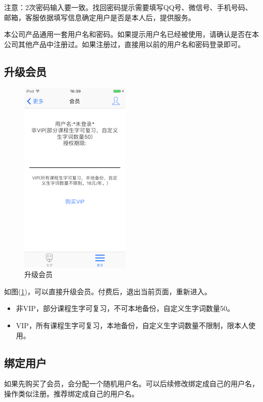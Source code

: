 注意：2次密码输入要一致。找回密码提示需要填写QQ号、微信号、手机号码、邮箱，客服依据填写信息确定用户是否是本人后，提供服务。

本公司产品通用一套用户名和密码。如果提示用户名已经被使用，请确认是否在本公司其他产品中注册过。如果注册过，直接用以前的用户名和密码登录即可。

\subsection{升级会员}
\begin{figure}[H]
	\centering
	\includegraphics{img/12.png}
	\caption{升级会员}
	\label{img12}
\end{figure}
如图(\ref{img12})，可以直接升级会员。付费后，退出当前页面，重新进入。

\begin{itemize}
	\item 非VIP，部分课程生字可复习，不可本地备份，自定义生字词数量50。
	\item VIP，所有课程生字可复习，本地备份，自定义生字词数量不限制，限本人使用。
\end{itemize}

\subsection{绑定用户}
如果先购买了会员，会分配一个随机用户名。可以后续修改绑定成自己的用户名，操作类似注册。推荐绑定成自己的用户名。


